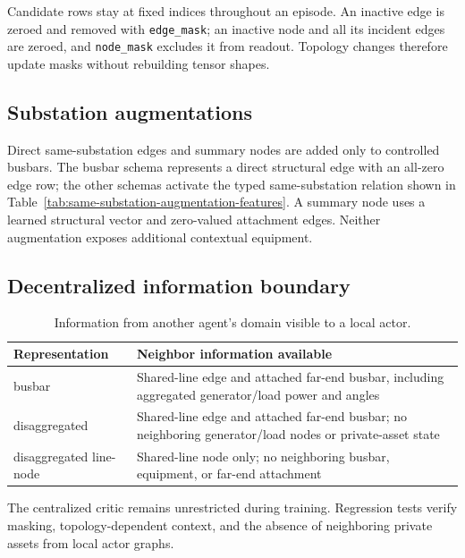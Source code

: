 Candidate rows stay at fixed indices throughout an episode. An inactive edge
is zeroed and removed with \texttt{edge\_mask}; an inactive node and all its
incident edges are zeroed, and \texttt{node\_mask} excludes it from readout.
Topology changes therefore update masks without rebuilding tensor shapes.

\subsection{Substation augmentations}
\label{app:graph-augmentation-details}

Direct same-substation edges and summary nodes are added only to controlled
busbars. The busbar schema represents a direct structural edge with an all-zero
edge row; the other schemas activate the typed same-substation relation shown
in Table~\ref{tab:same-substation-augmentation-features}. A summary node uses a
learned structural vector and zero-valued attachment edges. Neither
augmentation exposes additional contextual equipment.

\subsection{Decentralized information boundary}
\label{app:local-graphs}

\begin{table}[H]
  \centering
  \small
  \caption{Information from another agent's domain visible to a local actor.}
  \label{tab:local-information-boundary}
  \setlength{\tabcolsep}{4pt}
  \begin{tabular}{L{0.24\textwidth}L{0.64\textwidth}}
    \toprule
    Representation & Neighbor information available \\
    \midrule
    busbar & Shared-line edge and attached far-end busbar, including aggregated generator/load power and angles \\
    disaggregated & Shared-line edge and attached far-end busbar; no neighboring generator/load nodes or private-asset state \\
    disaggregated line-node & Shared-line node only; no neighboring busbar, equipment, or far-end attachment \\
    \bottomrule
  \end{tabular}
\end{table}

The centralized critic remains unrestricted during training. Regression tests
verify masking, topology-dependent context, and the absence of neighboring
private assets from local actor graphs.
